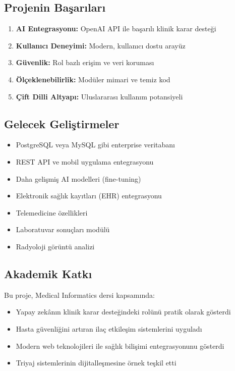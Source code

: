 \documentclass[12pt,a4paper]{article}
\begin{document}
\subsection{Projenin Başarıları}
\begin{enumerate}
    \item \textbf{AI Entegrasyonu:} OpenAI API ile başarılı klinik karar desteği
    \item \textbf{Kullanıcı Deneyimi:} Modern, kullanıcı dostu arayüz
    \item \textbf{Güvenlik:} Rol bazlı erişim ve veri koruması
    \item \textbf{Ölçeklenebilirlik:} Modüler mimari ve temiz kod
    \item \textbf{Çift Dilli Altyapı:} Uluslararası kullanım potansiyeli
\end{enumerate}

\subsection{Gelecek Geliştirmeler}
\begin{itemize}
    \item PostgreSQL veya MySQL gibi enterprise veritabanı
    \item REST API ve mobil uygulama entegrasyonu
    \item Daha gelişmiş AI modelleri (fine-tuning)
    \item Elektronik sağlık kayıtları (EHR) entegrasyonu
    \item Telemedicine özellikleri
    \item Laboratuvar sonuçları modülü
    \item Radyoloji görüntü analizi
\end{itemize}

\subsection{Akademik Katkı}
Bu proje, Medical Informatics dersi kapsamında:
\begin{itemize}
    \item Yapay zekânın klinik karar desteğindeki rolünü pratik olarak gösterdi
    \item Hasta güvenliğini artıran ilaç etkileşim sistemlerini uyguladı
    \item Modern web teknolojileri ile sağlık bilişimi entegrasyonunu gösterdi
    \item Triyaj sistemlerinin dijitalleşmesine örnek teşkil etti
\end{itemize}
\end{document}

